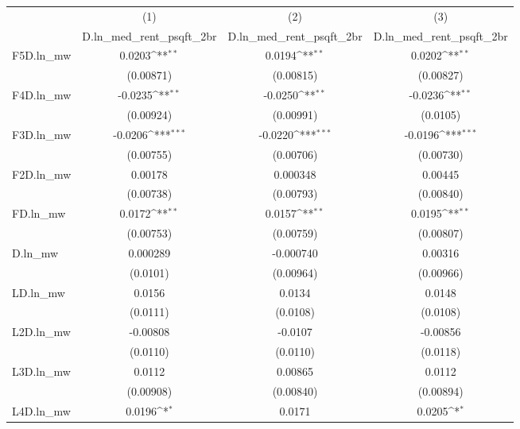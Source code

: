 {
\def\sym#1{\ifmmode^{#1}\else\(^{#1}\)\fi}
\begin{tabular}{l*{3}{c}}
\hline\hline
          &\multicolumn{1}{c}{(1)}&\multicolumn{1}{c}{(2)}&\multicolumn{1}{c}{(3)}\\
          &\multicolumn{1}{c}{D.ln\_med\_rent\_psqft\_2br}&\multicolumn{1}{c}{D.ln\_med\_rent\_psqft\_2br}&\multicolumn{1}{c}{D.ln\_med\_rent\_psqft\_2br}\\
\hline
F5D.ln\_mw &   0.0203\sym{**} &   0.0194\sym{**} &   0.0202\sym{**} \\
          &(0.00871)         &(0.00815)         &(0.00827)         \\
[1em]
F4D.ln\_mw &  -0.0235\sym{**} &  -0.0250\sym{**} &  -0.0236\sym{**} \\
          &(0.00924)         &(0.00991)         & (0.0105)         \\
[1em]
F3D.ln\_mw &  -0.0206\sym{***}&  -0.0220\sym{***}&  -0.0196\sym{***}\\
          &(0.00755)         &(0.00706)         &(0.00730)         \\
[1em]
F2D.ln\_mw &  0.00178         & 0.000348         &  0.00445         \\
          &(0.00738)         &(0.00793)         &(0.00840)         \\
[1em]
FD.ln\_mw  &   0.0172\sym{**} &   0.0157\sym{**} &   0.0195\sym{**} \\
          &(0.00753)         &(0.00759)         &(0.00807)         \\
[1em]
D.ln\_mw   & 0.000289         &-0.000740         &  0.00316         \\
          & (0.0101)         &(0.00964)         &(0.00966)         \\
[1em]
LD.ln\_mw  &   0.0156         &   0.0134         &   0.0148         \\
          & (0.0111)         & (0.0108)         & (0.0108)         \\
[1em]
L2D.ln\_mw & -0.00808         &  -0.0107         & -0.00856         \\
          & (0.0110)         & (0.0110)         & (0.0118)         \\
[1em]
L3D.ln\_mw &   0.0112         &  0.00865         &   0.0112         \\
          &(0.00908)         &(0.00840)         &(0.00894)         \\
[1em]
L4D.ln\_mw &   0.0196\sym{*}  &   0.0171         &   0.0205\sym{*}  \\

\end{tabular}}
